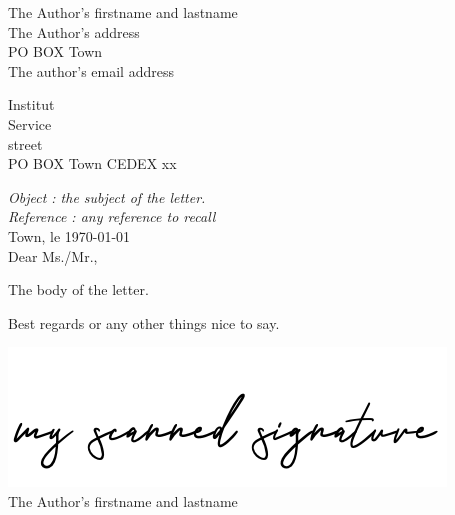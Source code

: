 \documentclass[french,article,12pt,a4paper,oneside,final]{memoir}
\begin{document}
%
\newlength{\spacer}
\def\longestline{PO BOX Town CEDEX xx}
\newlength{\linelength}
\settowidth{\linelength}{\longestline}
\addtolength{\spacer}{\textwidth}
\addtolength{\spacer}{-\linelength}
\noindent
\begin{minipage}[t]{\textwidth}
\raggedright
The Author's firstname and lastname\\
The Author's address\\
PO BOX Town\\
The author's email address\\
\end{minipage}
\begin{minipage}[t]{\textwidth}
\hspace*{\spacer}Institut\\ %
\hspace*{\spacer}Service\\%
\hspace*{\spacer}street\\
\hspace*{\spacer}\longestline
\vspace*{1cm}
\end{minipage}
\textit{Object : the subject of the letter.\\}
\textit{Reference : any reference to recall}
\vspace{0.5cm}\\
\hspace*{\spacer}Town, le \today
\vspace{0.5cm}\\
\indent Dear Ms./Mr.,

The body of the letter.

Best regards or any other things nice to say.
\vspace*{1cm}\\
\begin{flushright}
\includegraphics[scale=1]{resources/signature.png}
\vspace*{0.5cm}\\
The Author's firstname and lastname
\end{flushright}
\vfill
\end{document}
